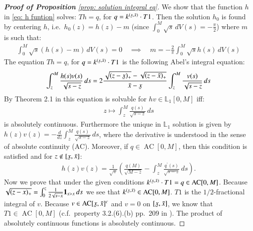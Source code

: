 \begin{proof}[\hypertarget{proof of solution integral eq}{\textbf{Proof of Proposition}}  \ref{prop: solution integral eq}]
    We show that the function $h$ in \eqref{eq: h funtion} solves: $Th = q$, for $q = k^{(\ubar{x},\bar{x})} \cdot T1$. Then the solution $h_0$ is found by centering $h$, i.e.\ $h_0 (z) = h(z) - m$ (since $\int_{0}^{M} \sqrt{s} \, dV(s) = - \frac{\pi}{2}$) where $m$ is such that:
    \begin{align*}
        \int_{0}^{M} \sqrt{s} \left( h(s) - m \right) \, dV(s) = 0 \quad \implies \quad m = - \frac{2}{\pi} \int_{0}^M \sqrt{s} h(s) \, dV(s)
    \end{align*}
    The equation $Th = q$, for $q = k^{(\ubar{x},\bar{x})} \cdot T1$ is the following Abel's integral equation:
    \begin{align*}
        \int_{z}^{M} \frac{h(s)v(s)}{\sqrt{s-z}} \, ds = 2 \frac{\sqrt{(z-\ubar{x})_{+}} - \sqrt{(z-\bar{x})_{+}}}{\bar{x}-\ubar{x}} \int_{z}^{M} \frac{v(s)}{\sqrt{s-z}} \, ds
    \end{align*}
    By Theorem 2.1 in \cite{26} this equation is solvable for $hv \in \mathbb{L}_1[0,M]$ iff:
    \begin{align*}
        z \mapsto \int_{z}^{M} \frac{q(s)}{\sqrt{s-z}} \, ds
    \end{align*}
    is absolutely continuous. Furthermore the unique in $\mathbb{L}_1$ solution is given by $h(z) v(z) = - \frac{d}{dz} \int_{z}^{M} \frac{q(s)}{\sqrt{s-z}} \, ds$, where the derivative is understood in the sense of absolute continuity (AC). Moreover, if $q \in \operatorname{AC}[0,M]$, then this condition is satisfied and for $z \notin [\ubar{x},\bar{x}]$:
    \begin{align}\label{eq: hv rewriting}
        h(z)v(z) = \frac{1}{\sqrt{\pi}}\left( \frac{q(M)}{\sqrt{M-z}} - \int_{z}^{M} \frac{q^{\prime} (s)}{\sqrt{s-z}} \, ds \right).
    \end{align}
    Now we prove that under the given conditions $ k^{(\ubar{x},\bar{x})} \cdot T1 = q \in \operatorname{AC}[0,M]$. Because $\sqrt{(z-x)_{+}} = \int_{0}^{z} \frac{1}{2\sqrt{s-x}} \mathbf{1}_{s>x} \, ds$ we see that $ k^{(\ubar{x},\bar{x})} \in \operatorname{AC}[0,M]$. $T1$ is the $1/2$-fractional integral of $v$. Because $v \in \operatorname{AC}[\ubar{x},\bar{x}]^c$ and $v=0$ on $[\ubar{x},\bar{x}]$, we know that $T1 \in \operatorname{AC}[0,M]$ (c.f.\ property 3.2.(6).(b) pp.\ 209 in \cite{27}). The product of absolutely continuous functions is absolutely continuous. 
    

\end{proof}

